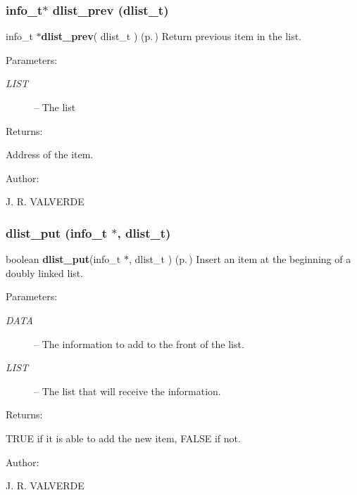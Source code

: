 \subsubsection{\setlength{\rightskip}{0pt plus 5cm}info\_\-t$\ast$ dlist\_\-prev ({\bf dlist\_\-t})}\label{P__dlist_8h_a14}


info\_\-t $\ast${\bf dlist\_\-prev}( dlist\_\-t ) {\rm (p.\,\pageref{P__dlist_8h_a14})} Return previous item in the list.

\begin{Desc}
\item[Parameters: ]\par
\begin{description}
\item[{\em 
LIST}]-- The list \end{description}
\end{Desc}
\begin{Desc}
\item[Returns: ]\par
Address of the item.\end{Desc}
\begin{Desc}
\item[Author: ]\par
J. R. VALVERDE \end{Desc}
\subsubsection{ dlist\_\-put (info\_\-t $\ast$, {\bf dlist\_\-t})}\label{P__dlist_8h_a2}


boolean {\bf dlist\_\-put}(info\_\-t $\ast$, dlist\_\-t ) {\rm (p.\,\pageref{P__dlist_8h_a2})} Insert an item at the beginning of a doubly linked list.

\begin{Desc}
\item[Parameters: ]\par
\begin{description}
\item[{\em 
DATA}]-- The information to add to the front of the list. \item[{\em 
LIST}]-- The list that will receive the information. \end{description}
\end{Desc}
\begin{Desc}
\item[Returns: ]\par
TRUE if it is able to add the new item, FALSE if not.\end{Desc}
\begin{Desc}
\item[Author: ]\par
J. R. VALVERDE \end{Desc}
